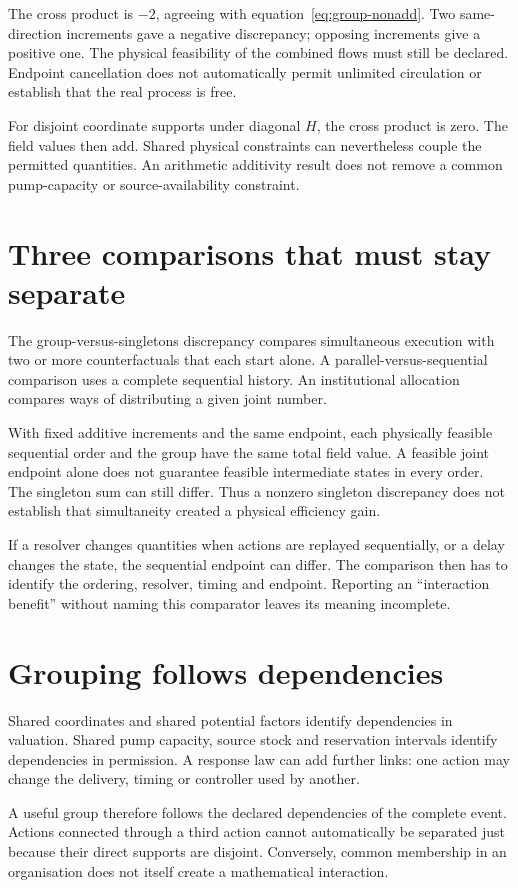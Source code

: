 The cross product is $-2$, agreeing with equation~\eqref{eq:group-nonadd}. Two same-direction increments gave a negative discrepancy; opposing increments give a positive one. The physical feasibility of the combined flows must still be declared. Endpoint cancellation does not automatically permit unlimited circulation or establish that the real process is free.

For disjoint coordinate supports under diagonal $H$, the cross product is zero. The field values then add. Shared physical constraints can nevertheless couple the permitted quantities. An arithmetic additivity result does not remove a common pump-capacity or source-availability constraint.

\section{Three comparisons that must stay separate}
The group-versus-singletons discrepancy compares simultaneous execution with two or more counterfactuals that each start alone. A parallel-versus-sequential comparison uses a complete sequential history. An institutional allocation compares ways of distributing a given joint number.

With fixed additive increments and the same endpoint, each physically feasible sequential order and the group have the same total field value. A feasible joint endpoint alone does not guarantee feasible intermediate states in every order. The singleton sum can still differ. Thus a nonzero singleton discrepancy does not establish that simultaneity created a physical efficiency gain.

If a resolver changes quantities when actions are replayed sequentially, or a delay changes the state, the sequential endpoint can differ. The comparison then has to identify the ordering, resolver, timing and endpoint. Reporting an ``interaction benefit'' without naming this comparator leaves its meaning incomplete.

\section{Grouping follows dependencies}
Shared coordinates and shared potential factors identify dependencies in valuation. Shared pump capacity, source stock and reservation intervals identify dependencies in permission. A response law can add further links: one action may change the delivery, timing or controller used by another.

A useful group therefore follows the declared dependencies of the complete event. Actions connected through a third action cannot automatically be separated just because their direct supports are disjoint. Conversely, common membership in an organisation does not itself create a mathematical interaction.

